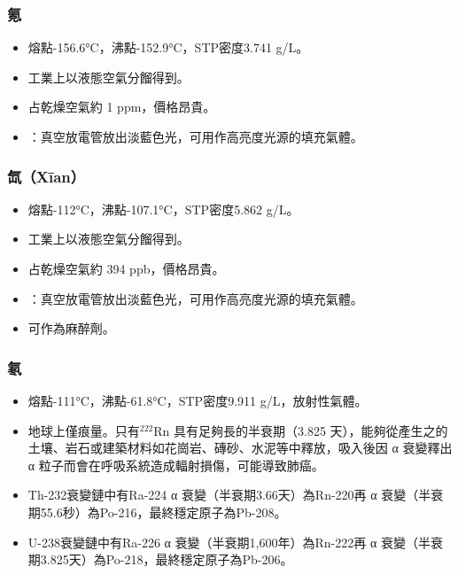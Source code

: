 \documentclass[a4paper,12pt]{report}
\begin{document}
\begin{itemize}
\begin{itemize}
\subsubsection{氪}
\begin{itemize}
\item 熔點-156.6°C，沸點-152.9°C，STP密度3.741 g/L。
\item 工業上以液態空氣分餾得到。
\item 占乾燥空氣約 1 ppm，價格昂貴。
\item {}：真空放電管放出淡藍色光，可用作高亮度光源的填充氣體。
\end{itemize}
\subsubsection{氙（Xīan）}
\begin{itemize}
\item 熔點-112°C，沸點-107.1°C，STP密度5.862 g/L。
\item 工業上以液態空氣分餾得到。
\item 占乾燥空氣約 394 ppb，價格昂貴。
\item {}：真空放電管放出淡藍色光，可用作高亮度光源的填充氣體。
\item 可作為麻醉劑。
\end{itemize}
\subsubsection{氡}
\begin{itemize}
\item 熔點-111°C，沸點-61.8°C，STP密度9.911 g/L，放射性氣體。
\item 地球上僅痕量。只有$^{222}$Rn 具有足夠長的半衰期（3.825 天），能夠從產生之的土壤、岩石或建築材料如花崗岩、磚砂、水泥等中釋放，吸入後因 α 衰變釋出 α 粒子而會在呼吸系統造成輻射損傷，可能導致肺癌。
\item Th-232衰變鏈中有Ra-224 α 衰變（半衰期3.66天）為Rn-220再 α 衰變（半衰期55.6秒）為Po-216，最終穩定原子為Pb-208。
\item U-238衰變鏈中有Ra-226 α 衰變（半衰期1,600年）為Rn-222再 α 衰變（半衰期3.825天）為Po-218，最終穩定原子為Pb-206。
\end{itemize}

\end{itemize}
\end{itemize}
\end{document}
